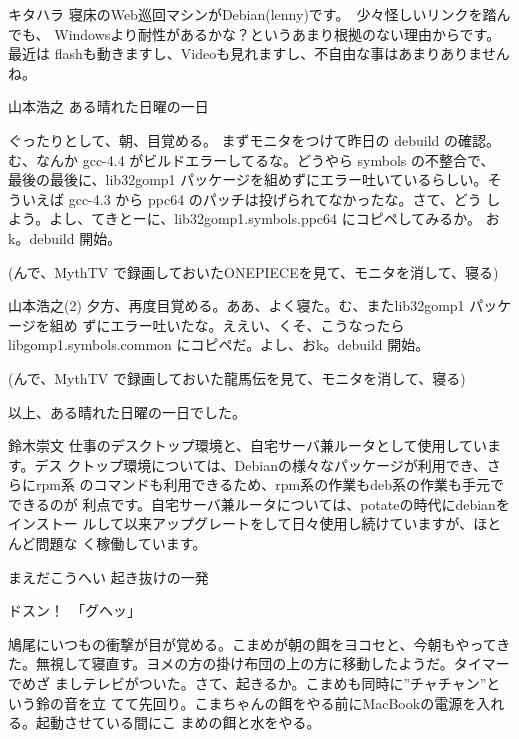 \begin{frame}{キタハラ}
寝床のWeb巡回マシンがDebian(lenny)です。　少々怪しいリンクを踏んでも、
 Windowsより耐性があるかな？というあまり根拠のない理由からです。　最近は
 flashも動きますし、Videoも見れますし、不自由な事はあまりありませんね。
\end{frame}

\begin{frame}{山本浩之}
ある晴れた日曜の一日

 ぐったりとして、朝、目覚める。 まずモニタをつけて昨日の debuild の確認。
 む、なんか gcc-4.4 がビルドエラーしてるな。どうやら symbols の不整合で、
 最後の最後に、lib32gomp1 パッケージを組めずにエラー吐いているらしい。そ
 ういえば gcc-4.3 から ppc64 のパッチは投げられてなかったな。さて、どう
 しよう。よし、てきとーに、lib32gomp1.symbols.ppc64 にコピペしてみるか。
 おk。debuild 開始。

 (んで、MythTV で録画しておいたONEPIECEを見て、モニタを消して、寝る)
\end{frame}

\begin{frame}{山本浩之(2)}
 夕方、再度目覚める。ああ、よく寝た。む、またlib32gomp1 パッケージを組め
 ずにエラー吐いたな。ええい、くそ、こうなったら libgomp1.symbols.common
 にコピペだ。よし、おk。debuild 開始。

 (んで、MythTV で録画しておいた龍馬伝を見て、モニタを消して、寝る)

 以上、ある晴れた日曜の一日でした。
\end{frame}

\begin{frame}{鈴木崇文}
 仕事のデスクトップ環境と、自宅サーバ兼ルータとして使用しています。デス
 クトップ環境については、Debianの様々なパッケージが利用でき、さらにrpm系
 のコマンドも利用できるため、rpm系の作業もdeb系の作業も手元でできるのが
 利点です。自宅サーバ兼ルータについては、potateの時代にdebianをインストー
 ルして以来アップグレートをして日々使用し続けていますが、ほとんど問題な
 く稼働しています。
\end{frame}

\begin{frame}{まえだこうへい}
起き抜けの一発

 ドスン！　「グヘッ」

 鳩尾にいつもの衝撃が目が覚める。こまめが朝の餌をヨコセと、今朝もやってき
 た。無視して寝直す。ヨメの方の掛け布団の上の方に移動したようだ。タイマーでめざ
ましテレビがついた。さて、起きるか。こまめも同時に''チャチャン''という鈴の音を立
てて先回り。こまちゃんの餌をやる前にMacBookの電源を入れる。起動させている間にこ
まめの餌と水をやる。
\end{frame}

